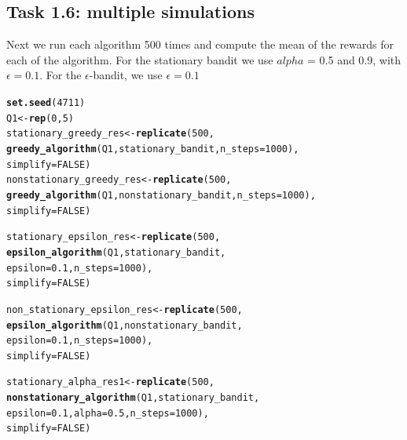 \documentclass[10pt, a4paper, english]{article}\usepackage[]{graphicx}\usepackage[dvipsnames]{xcolor}
\makeatletter
\newcommand{\hlnum}[1]{\textcolor[rgb]{0.686,0.059,0.569}{#1}}%
\newcommand{\hlstd}[1]{\textcolor[rgb]{0.345,0.345,0.345}{#1}}%
\newcommand{\hlkwb}[1]{\textcolor[rgb]{0.69,0.353,0.396}{#1}}%
\newcommand{\hlkwc}[1]{\textcolor[rgb]{0.333,0.667,0.333}{#1}}%
\newcommand{\hlkwd}[1]{\textcolor[rgb]{0.737,0.353,0.396}{\textbf{#1}}}%
\newenvironment{kframe}{%
 \def\at@end@of@kframe{}%
 \ifinner\ifhmode%
  \def\at@end@of@kframe{\end{minipage}}%
  \begin{minipage}{\columnwidth}%
 \fi\fi%
 \def\FrameCommand##1{\hskip\@totalleftmargin \hskip-\fboxsep
 \colorbox{shadecolor}{##1}\hskip-\fboxsep
     \hskip-\linewidth \hskip-\@totalleftmargin \hskip\columnwidth}%
 \MakeFramed {\advance\hsize-\width
   \@totalleftmargin\z@ \linewidth\hsize
   \@setminipage}}%
 {\par\unskip\endMakeFramed%
 \at@end@of@kframe}
\newenvironment{knitrout}{}{} %
\makeatother
\begin{document}
\subsection{Task 1.6: multiple simulations}
Next we run each algorithm 500 times and compute the mean of the rewards for each of the algorithm.
For the stationary bandit we use $alpha$ = 0.5 and 0.9, with $\epsilon = 0.1$. 
For the $\epsilon$-bandit, we use $\epsilon = 0.1$
\begin{knitrout}
\color{fgcolor}\begin{kframe}
\begin{alltt}
\hlkwd{set.seed}\hlstd{(}\hlnum{4711}\hlstd{)}
\hlstd{Q1} \hlkwb{<-} \hlkwd{rep}\hlstd{(}\hlnum{0}\hlstd{,} \hlnum{5}\hlstd{)}
\hlstd{stationary_greedy_res}\hlkwb{<-} \hlkwd{replicate}\hlstd{(}\hlnum{500}\hlstd{,}
                            \hlkwd{greedy_algorithm}\hlstd{(Q1, stationary_bandit,} \hlkwc{n_steps}\hlstd{=}\hlnum{1000}\hlstd{),}
                          \hlkwc{simplify} \hlstd{=} \hlnum{FALSE}\hlstd{)}
\hlstd{nonstationary_greedy_res} \hlkwb{<-} \hlkwd{replicate}\hlstd{(}\hlnum{500}\hlstd{,}
                                \hlkwd{greedy_algorithm}\hlstd{(Q1, nonstationary_bandit,} \hlkwc{n_steps}\hlstd{=}\hlnum{1000}\hlstd{),}
                              \hlkwc{simplify} \hlstd{=} \hlnum{FALSE}\hlstd{)}

\hlstd{stationary_epsilon_res} \hlkwb{<-} \hlkwd{replicate}\hlstd{(}\hlnum{500}\hlstd{,}
                              \hlkwd{epsilon_algorithm}\hlstd{(Q1, stationary_bandit,}
                                                \hlkwc{epsilon} \hlstd{=} \hlnum{0.1}\hlstd{,} \hlkwc{n_steps}\hlstd{=}\hlnum{1000}\hlstd{),}
                            \hlkwc{simplify} \hlstd{=} \hlnum{FALSE}\hlstd{)}

\hlstd{non_stationary_epsilon_res} \hlkwb{<-} \hlkwd{replicate}\hlstd{(}\hlnum{500}\hlstd{,}
                                    \hlkwd{epsilon_algorithm}\hlstd{(Q1, nonstationary_bandit,}
                                         \hlkwc{epsilon} \hlstd{=} \hlnum{0.1}\hlstd{,} \hlkwc{n_steps}\hlstd{=}\hlnum{1000}\hlstd{),}
                                \hlkwc{simplify} \hlstd{=} \hlnum{FALSE}\hlstd{)}


\hlstd{stationary_alpha_res1} \hlkwb{<-} \hlkwd{replicate}\hlstd{(}\hlnum{500}\hlstd{,}
                                   \hlkwd{nonstationary_algorithm}\hlstd{(Q1, stationary_bandit,}
                                       \hlkwc{epsilon} \hlstd{=} \hlnum{0.1}\hlstd{,} \hlkwc{alpha}\hlstd{=}\hlnum{0.5}\hlstd{,} \hlkwc{n_steps}\hlstd{=}\hlnum{1000}\hlstd{),}
                                   \hlkwc{simplify} \hlstd{=} \hlnum{FALSE}\hlstd{)}


\end{alltt}
\end{kframe}
\end{knitrout}
\end{document}
